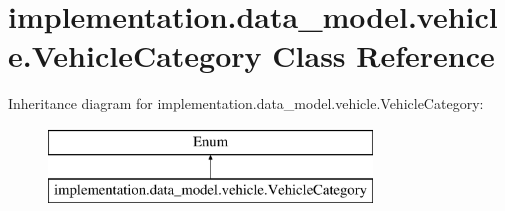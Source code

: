 \hypertarget{classimplementation_1_1data__model_1_1vehicle_1_1_vehicle_category}{}\section{implementation.\+data\+\_\+model.\+vehicle.\+Vehicle\+Category Class Reference}
\label{classimplementation_1_1data__model_1_1vehicle_1_1_vehicle_category}
Inheritance diagram for implementation.\+data\+\_\+model.\+vehicle.\+Vehicle\+Category\+:\begin{figure}[H]
\begin{center}
\leavevmode
\includegraphics[height=2.000000cm]{classimplementation_1_1data__model_1_1vehicle_1_1_vehicle_category}
\end{center}
\end{figure}
